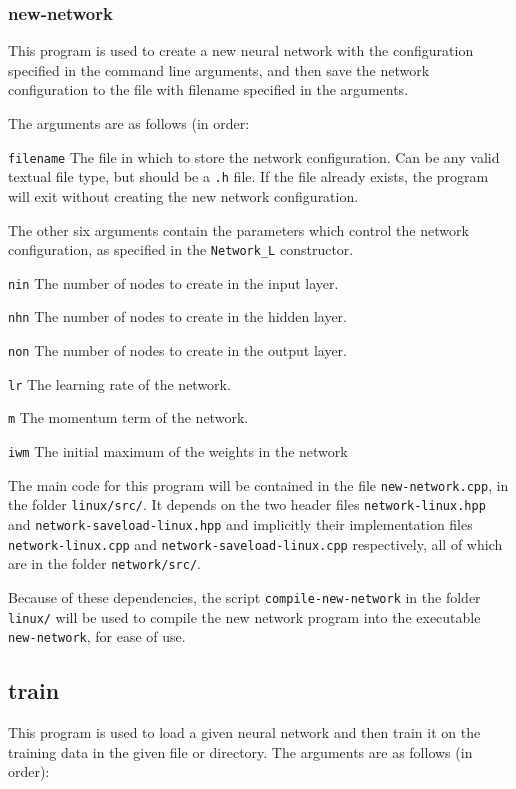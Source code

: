\documentclass[a4paper]{article}
\begin{document}
\subsubsection{new-network}

This program is used to create a new neural network with the configuration specified in the command line arguments, and then save the network configuration to the file with filename specified in the arguments.

The arguments are as follows (in order:

\lstinline{filename} The file in which to store the network configuration. Can be any valid textual file type, but should be a \lstinline{.h} file. If the file already exists, the program will exit without creating the new network configuration.

The other six arguments contain the parameters which control the network configuration, as specified in the \lstinline{Network_L} constructor.

\lstinline{nin} The number of nodes to create in the input layer.

\lstinline{nhn} The number of nodes to create in the hidden layer.

\lstinline{non} The number of nodes to create in the output layer.

\lstinline{lr} The learning rate of the network.

\lstinline{m} The momentum term of the network.

\lstinline{iwm} The initial maximum of the weights in the network

The main code for this program will be contained in the file \lstinline{new-network.cpp}, in the folder \lstinline{linux/src/}. It depends on the two header files \lstinline{network-linux.hpp} and \lstinline{network-saveload-linux.hpp} and implicitly their implementation files \lstinline{network-linux.cpp} and \lstinline{network-saveload-linux.cpp} respectively, all of which are in the folder \lstinline{network/src/}.

Because of these dependencies, the script \lstinline{compile-new-network} in the folder \lstinline{linux/} will be used to compile the new network program into the executable \lstinline{new-network}, for ease of use.

\subsection{train}

This program is used to load a given neural network and then train it on the training data in the given file or directory. The arguments are as follows (in order):
\end{document}
